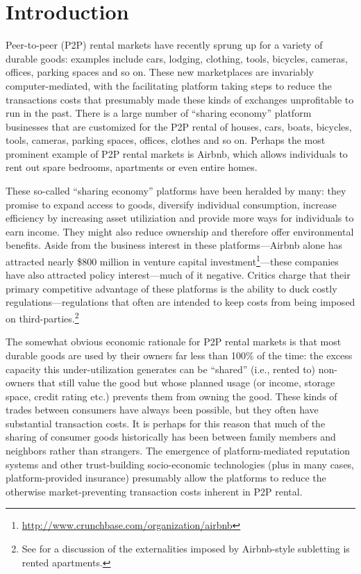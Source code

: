 \documentclass[11pt]{article}
\begin{document}
\section{Introduction}
Peer-to-peer (P2P) rental markets have recently sprung up for a variety of durable goods:
examples include cars, lodging, clothing, tools, bicycles, cameras, offices, parking spaces and so on.
These new marketplaces are invariably computer-mediated, with the facilitating platform taking steps to reduce the transactions costs that presumably made these kinds of exchanges unprofitable to run in the past. 
There is a large number of ``sharing economy'' platform businesses that are customized for the P2P rental of houses, cars, boats, bicycles, tools, cameras, parking spaces, offices, clothes and so on. 
Perhaps the most prominent example of P2P rental markets is Airbnb, which allows individuals to rent out spare bedrooms, apartments or even entire homes. 

These so-called ``sharing economy'' platforms have been heralded by many: 
they promise to expand access to goods, diversify individual consumption, increase efficiency by increasing asset utiliziation and provide more ways for individuals to earn income.
They might also reduce ownership and therefore offer environmental benefits.  
Aside from the business interest in these platforms---Airbnb alone has attracted nearly \$800 million in venture capital investment\footnote{\href{http://www.crunchbase.com/organization/airbnb}{http://www.crunchbase.com/organization/airbnb}}---these companies have also attracted policy interest---much of it negative. 
Critics charge that their primary competitive advantage of these platforms is the ability to duck costly regulations---regulations that often are intended to keep costs from being imposed on third-parties.\footnote{See \cite{horton2014tragedy} for a discussion of the externalities imposed by Airbnb-style subletting is rented apartments.}   

The somewhat obvious economic rationale for P2P rental markets is that most durable goods are used by their owners far less than 100\% of the time: the excess capacity this under-utilization generates can be ``shared'' (i.e., rented to) non-owners that still value the good but whose planned usage (or income, storage space, credit rating etc.) prevents them from owning the good. 
These kinds of trades between consumers have always been possible, but they often have substantial transaction costs.
It is perhaps for this reason that much of the sharing of consumer goods historically has been between family members and neighbors rather than strangers. 
The emergence of platform-mediated reputation systems and other trust-building socio-economic technologies (plus in many cases, platform-provided insurance) presumably allow the platforms to reduce the otherwise market-preventing transaction costs inherent in P2P rental. 
\end{document}
